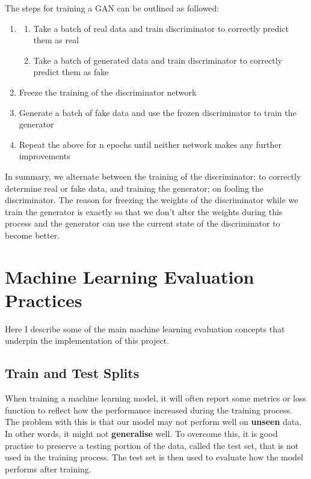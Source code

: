 \documentclass[12pt,a4paper,twoside]{report}
\begin{document}
The steps for training a GAN can be outlined as followed:
\begin{enumerate}[Step 1:]
  \item 
  \begin{enumerate}
  \item Take a batch of real data and train discriminator to correctly predict them as real
  \item Take a batch of generated data and train discriminator to correctly predict them as fake
\end{enumerate}
  
  \item Freeze the training of the discriminator network
  \item Generate a batch of fake data and use the frozen discriminator to train the generator
  \item Repeat the above for n epochs until neither network makes any further improvements
\end{enumerate}

In summary, we alternate between the training of the discriminator; to correctly determine real or fake data, and training the generator; on fooling the discriminator. The reason for freezing the weights of the discriminator while we train the generator is exactly so that we don't alter the weights during this process and the generator can use the current state of the discriminator to become better.

\section{Machine Learning Evaluation Practices}
Here I describe some of the main machine learning evaluation concepts that underpin the implementation of this project. 

\subsection{Train and Test Splits}

When training a machine learning model, it will often report some metrics or loss function to reflect how the performance increased during the training process. The problem with this is that our model may not perform well on \textbf{unseen} data. In other words, it might not \textbf{generalise} well. To overcome this, it is good practise to preserve a testing portion of the data, called the test set, that is not used in the training process. The test set is then used to evaluate how the model performs after training. 
\end{document}
